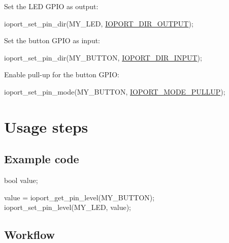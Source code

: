 \begin{DoxyEnumerate}
\begin{DoxyItemize}
\end{DoxyItemize}
\item Set the L\-E\-D G\-P\-I\-O as output\-:
\begin{DoxyItemize}
\item 
\begin{DoxyCode}
 ioport\_set\_pin\_dir(MY\_LED, \hyperlink{group__ioport__group_gga9c267f89800e58bd9dfd74e662a4a4c1a06de24313dad0169f3a366c62a84f4cc}{IOPORT\_DIR\_OUTPUT}); 
\end{DoxyCode}

\end{DoxyItemize}
\item Set the button G\-P\-I\-O as input\-:
\begin{DoxyItemize}
\item 
\begin{DoxyCode}
 ioport\_set\_pin\_dir(MY\_BUTTON, \hyperlink{group__ioport__group_gga9c267f89800e58bd9dfd74e662a4a4c1af854a0dce084e5a8e8744f9a502e7b7b}{IOPORT\_DIR\_INPUT}); 
\end{DoxyCode}

\end{DoxyItemize}
\item Enable pull-\/up for the button G\-P\-I\-O\-:
\begin{DoxyItemize}
\item 
\begin{DoxyCode}
 ioport\_set\_pin\_mode(MY\_BUTTON, \hyperlink{group__ioport__group_ga4c5d85e77f012b73dce89cfb84ef851f}{IOPORT\_MODE\_PULLUP}); 
\end{DoxyCode}

\end{DoxyItemize}
\end{DoxyEnumerate}\hypertarget{ioport_quickstart_use_case_1_ioport_quickstart_basic_usage}{}\section{Usage steps}\label{ioport_quickstart_use_case_1_ioport_quickstart_basic_usage}
\hypertarget{ioport_quickstart_use_case_1_ioport_quickstart_basic_usage_code}{}\subsection{Example code}\label{ioport_quickstart_use_case_1_ioport_quickstart_basic_usage_code}

\begin{DoxyCode}
         \textcolor{keywordtype}{bool} value;

         value = ioport\_get\_pin\_level(MY\_BUTTON);
         ioport\_set\_pin\_level(MY\_LED, value);
\end{DoxyCode}
\hypertarget{ioport_quickstart_use_case_1_ioport_quickstart_basic_usage_flow}{}\subsection{Workflow}\label{ioport_quickstart_use_case_1_ioport_quickstart_basic_usage_flow}

